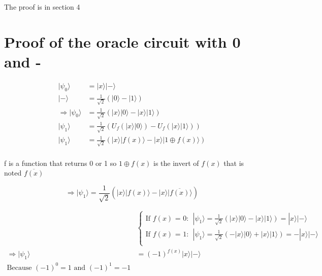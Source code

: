 \documentclass{article}
\begin{document}
The proof is in section 4

\section{Proof of the oracle circuit with 0 and -}

\begin{equation}
    \begin{split}
        |\psi_0\rangle & = |x\rangle|-\rangle \\
        |-\rangle & = \frac{1}{\sqrt{2}}(|0\rangle - |1\rangle) \\
        \Longrightarrow |\psi_0\rangle & = \frac{1}{\sqrt{2}}(|x\rangle|0\rangle - |x\rangle|1\rangle) \\
        |\psi_1\rangle & = \frac{1}{\sqrt{2}}(U_f(|x\rangle|0\rangle) - U_f(|x\rangle|1\rangle)) \\
        |\psi_1\rangle & = \frac{1}{\sqrt{2}}(|x\rangle|f(x)\rangle - |x\rangle|1 \oplus f(x)\rangle) \\
    \end{split}
\end{equation}

f is a function that returns 0 or 1 so $1 \oplus f(x)$ is the invert of $f(x)$ that is noted $\overline{f(x)}$

\begin{equation}
    \Longrightarrow |\psi_1\rangle = \frac{1}{\sqrt{2}}(|x\rangle|f(x)\rangle - |x\rangle|\overline{f(x)}\rangle)
\end{equation}

\begin{equation}
    \begin{split}
        & \begin{cases}
            \text{If $f(x)$ = 0:} & |\psi_1\rangle = \frac{1}{\sqrt{2}}(|x\rangle|0\rangle - |x\rangle|1\rangle)
            = |x\rangle|-\rangle \\
            \text{If $f(x)$ = 1:} & |\psi_1\rangle = \frac{1}{\sqrt{2}}(- |x\rangle|0\rangle + |x\rangle|1\rangle)
            = -|x\rangle|-\rangle\\
        \end{cases} \\
        \Longrightarrow |\psi_1\rangle & = (-1)^{f(x)}|x\rangle|-\rangle \\
        \text{Because $(-1)^0 = 1$ and $(-1)^1 = -1$} \\
    \end{split}
\end{equation}
\end{document}
